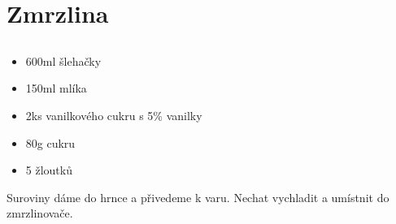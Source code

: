 \documentclass[10pt,a4paper]{article}
\newenvironment{myitemize}
{ \begin{itemize}
    \setlength{\itemsep}{0pt}
    \setlength{\parskip}{0pt}
    \setlength{\parsep}{0pt}     }
{ \end{itemize}                  }
\begin{document}
\section{Zmrzlina}
\subsection{}
\begin{minipage}[t]{0,5\textwidth}
\begin{myitemize} 
\item 600ml šlehačky
\item 150ml mlíka
\item 2ks vanilkového cukru s 5\% vanilky
\item 80g cukru
\item 5 žloutků
\end{myitemize}
\end{minipage}
\begin{minipage}[t]{0,5\textwidth}
Suroviny dáme do hrnce a přivedeme k varu. Nechat vychladit a umístnit do zmrzlinovače.
\end{minipage}
\end{document}
